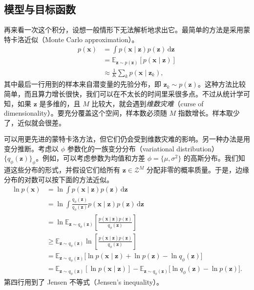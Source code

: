 \subsection{模型与目标函数}
再来看一次这个积分，设想一般情形下无法解析地求出它。最简单的方法是采用蒙特卡洛近似（Monte Carlo approximation）。
\begin{align}
p(\mathbf{x})&=\int p(\mathbf{x}\mid\mathbf{z})p(\mathbf{z})\,\mathrm{d}\mathbf{z} \tag{5.8}\label{eq:05-08}\\
 &=\mathbb{E}_{\mathbf{z}\sim p(\mathbf{z})}[p(\mathbf{x}\mid\mathbf{z})] \tag{5.9}\label{eq:05-09}\\
 &\approx\frac{1}{K}\sum_k p(\mathbf{x}\mid\mathbf{z}_k), \tag{5.10}\label{eq:05-10}
\end{align}
其中最后一行用到的样本来自潜变量的先验分布，即 $\mathbf{z}_k\sim p(\mathbf{z})$。这种方法比较简单，而且算力增长很快，我们可以在不太长的时间里采很多点。不过从统计学可知，如果 $\mathbf{z}$ 是多维的，且 $M$ 比较大，就会遇到\emph{维数灾难}（curse of dimensionality）。要充分覆盖这个空间，样本数必须随 $M$ 指数增长。样本取少了，近似就会很差。

可以用更先进的蒙特卡洛方法，但它们仍会受到维数灾难的影响。另一种办法是用变分推断。考虑以 $\phi$ 参数化的一族变分分布（variational distribution）$\{q_\phi(\mathbf{z})\}_\phi$。例如，可以考虑参数为均值和方差 $\phi=\{\mu,\sigma^2\}$ 的高斯分布。我们知道这些分布的形式，并假设它们给所有 $\mathbf{z}\in\mathcal{Z}^M$ 分配非零的概率质量。于是，边缘分布的对数可以按下面的方法近似。
\begin{align}
\ln p(\mathbf{x})&=\ln\int p(\mathbf{x}\mid\mathbf{z})p(\mathbf{z})\,\mathrm{d}\mathbf{z} \tag{5.11}\label{eq:05-11}\\
 &=\ln\int\frac{q_\phi(\mathbf{z})}{q_\phi(\mathbf{z})}
        p(\mathbf{x}\mid\mathbf{z})p(\mathbf{z})\,\mathrm{d}\mathbf{z} \tag{5.12}\label{eq:05-12}\\
 &=\ln\mathbb{E}_{\mathbf{z}\sim q_\phi(\mathbf{z})}
        \left[\frac{p(\mathbf{x}\mid\mathbf{z})p(\mathbf{z})}{q_\phi(\mathbf{z})}\right] \tag{5.13}\label{eq:05-13}\\
 &\geq\mathbb{E}_{\mathbf{z}\sim q_\phi(\mathbf{z})}\ln
        \left[\frac{p(\mathbf{x}\mid\mathbf{z})p(\mathbf{z})}{q_\phi(\mathbf{z})}\right] \tag{5.14}\label{eq:05-14}\\
 &=\mathbb{E}_{\mathbf{z}\sim q_\phi(\mathbf{z})}
        \bigl[\ln p(\mathbf{x}\mid\mathbf{z})+\ln p(\mathbf{z})-\ln q_\phi(\mathbf{z})\bigr] \tag{5.15}\label{eq:05-15}\\
 &=\mathbb{E}_{\mathbf{z}\sim q_\phi(\mathbf{z})}[\ln p(\mathbf{x}\mid\mathbf{z})]-
        \mathbb{E}_{\mathbf{z}\sim q_\phi(\mathbf{z})}\bigl[\ln q_\phi(\mathbf{z})-\ln p(\mathbf{z})\bigr]. \tag{5.16}\label{eq:05-16}
\end{align}
第四行用到了 Jensen 不等式（Jensen's inequality）。


